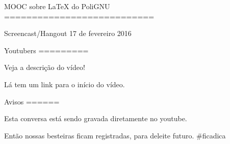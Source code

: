 MOOC sobre LaTeX do PoliGNU
===========================

Screencast/Hangout     17 de fevereiro 2016


Youtubers
=========

Veja a descrição do vídeo!

Lá tem um link para o início do vídeo.


Avisos
======

Esta conversa está sendo gravada
diretamente no youtube.

Então nossas besteiras ficam registradas,
para deleite futuro. #ficadica

